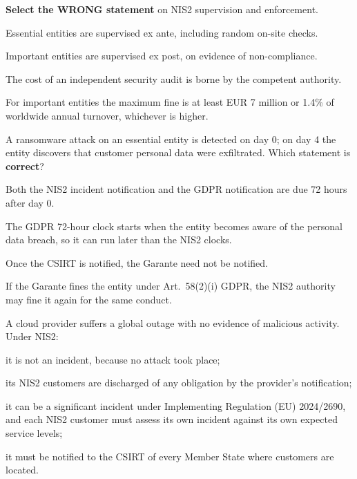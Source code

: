 \begin{domanda}\label{q:nis2-vigilanza}
\textbf{Select the WRONG statement} on NIS2 supervision and enforcement.
\begin{opzioni}
  \item Essential entities are supervised ex ante, including random on-site checks.
  \item Important entities are supervised ex post, on evidence of non-compliance.
  \item The cost of an independent security audit is borne by the competent authority.
  \item For important entities the maximum fine is at least EUR 7 million or 1.4\% of worldwide
    annual turnover, whichever is higher.
\end{opzioni}
\end{domanda}

\begin{domanda}\label{q:nis2-gdpr-orologi}
A ransomware attack on an essential entity is detected on day 0; on day 4 the entity discovers that
customer personal data were exfiltrated. Which statement is \textbf{correct}?
\begin{opzioni}
  \item Both the NIS2 incident notification and the GDPR notification are due 72 hours after day 0.
  \item The GDPR 72-hour clock starts when the entity becomes aware of the personal data breach, so it
    can run later than the NIS2 clocks.
  \item Once the CSIRT is notified, the Garante need not be notified.
  \item If the Garante fines the entity under Art.~58(2)(i) GDPR, the NIS2 authority may fine it again
    for the same conduct.
\end{opzioni}
\end{domanda}

\begin{domanda}\label{q:nis2-cloud}
A cloud provider suffers a global outage with no evidence of malicious activity. Under NIS2:
\begin{opzioni}
  \item it is not an incident, because no attack took place;
  \item its NIS2 customers are discharged of any obligation by the provider's notification;
  \item it can be a significant incident under Implementing Regulation (EU) 2024/2690, and each NIS2
    customer must assess its own incident against its own expected service levels;
  \item it must be notified to the CSIRT of every Member State where customers are located.
\end{opzioni}
\end{domanda}

